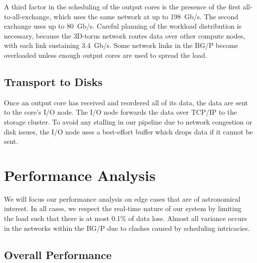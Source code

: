 \documentclass{llncs}
\begin{document}
A third factor in the scheduling of the output cores is the presence of the first all-to-all-exchange, which uses the same network at up to 198~Gb/s. The second exchange uses up to 80~Gb/s. Careful planning of the workload distribution is necessary, because the 3D-torus network routes data over other compute nodes, with each link sustaining 3.4~Gb/s. Some network links in the BG/P become overloaded unless enough output cores are used to spread the load.

\subsection{Transport to Disks}
Once an output core has received and reordered all of its data, the data are sent to the core's I/O node. The I/O node forwards the data over TCP/IP to the storage cluster. To avoid any stalling in our pipeline due to network congestion or disk issues, the I/O node uses a best-effort buffer which drops data if it cannot be sent.


\section{Performance Analysis}

We will focus our performance analysis on edge cases that are of astronomical interest. In all cases, we respect the real-time nature of our system by limiting the load such that there is at most 0.1\% of data loss. Almost all variance occurs in the networks within the BG/P due to clashes caused by scheduling intricacies.

\subsection{Overall Performance}
\end{document}
